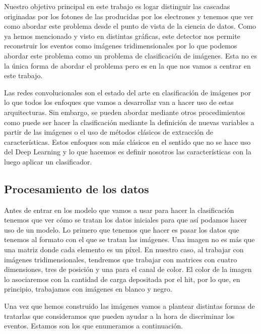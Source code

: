 \documentclass[a4paper,12pt,twoside,titlepage]{article}
\begin{document}
Nuestro objetivo principal en este trabajo es logar distinguir las cascadas originadas por los fotones de las producidas por los electrones y tenemos que ver como abordar este problema desde el punto de vista de la ciencia de datos. Como ya hemos mencionado y visto en distintas gráficas, este detector nos permite reconstruir los eventos como imágenes tridimensionales por lo que podemos abordar este problema como un problema de clasificación de imágenes. Esta no es la única forma de abordar el problema pero es en la que nos vamos a centrar en este trabajo.

Las redes convolucionales son el estado del arte en clasificación de imágenes por lo que todos los enfoques que vamos a desarrollar van a hacer uso de estas arquitecturas. Sin embargo, se pueden abordar mediante otros procedimientos como puede ser hacer la clasificación mediante la definición de nuevas variables a partir de las imágenes o el uso de métodos clásicos de extracción de características. Estos enfoques son más clásicos en el sentido que no se hace uso del Deep Learning y lo que hacemos es definir nosotros las características con la luego aplicar un clasificador.

\subsection{Procesamiento de los datos}
\label{sec:des_trat}
Antes de entrar en los modelo que vamos a usar para hacer la clasificación tenemos que ver cómo  se tratan los datos iniciales para que así podamos hacer uso de un modelo. Lo primero que tenemos que hacer es pasar los datos que tenemos al formato con el que se tratan las imágenes. Una imagen no es más que una matriz donde cada elemento es un píxel. En nuestro caso, al trabajar con imágenes tridimensionales, tendremos que trabajar con matrices con cuatro dimensiones, tres de posición y una para el canal de color. El color de la imagen lo asociaremos con la cantidad de carga depositada por el hit, por lo que, en principio, trabajamos con imágenes en blanco y negro.

Una vez que hemos construido las imágenes vamos a plantear distintas formas de tratarlas que consideramos que pueden ayudar a la hora de discriminar los eventos. Estamos son los que enumeramos a continuación.
\end{document}
